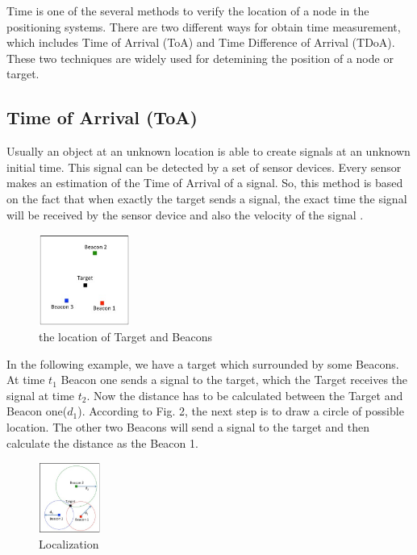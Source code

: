 Time is one of the several methods to verify the location of a node in the positioning systems. There are two different ways for obtain time measurement, which includes Time of Arrival (ToA) and Time Difference of Arrival (TDoA). These two techniques are widely used for detemining the position of a node or target.

\subsection{Time of Arrival (ToA)}

Usually an object at an unknown location is able to create signals at an unknown initial time. This signal can be detected by a set of sensor devices. Every sensor makes an estimation of the Time of Arrival of a signal. So, this method is based on the fact that when exactly the target sends a signal, the exact time the signal will be received by the sensor device and also the velocity of the signal \cite{brian17}.

\begin{figure}[htp]
    \centering
    \includegraphics[width=3cm]{1.jpg}
    \caption{the location of Target and Beacons \cite{brian17}}
    \label{fig:Target location}
\end{figure}

In the following example, we have a target which surrounded by some Beacons. At time $t_1$ Beacon one sends a signal to the target, which the Target receives the signal at time $t_2$. Now the distance has to be calculated between the Target and Beacon one($d_1$). According to Fig. 2, the next step is to draw a circle of possible location. The other two Beacons will send a signal to the target and then calculate the distance as the Beacon 1.

\begin{figure}[htp]
    \centering
    \includegraphics[width=2cm]{2.jpg}
    \caption{Localization \cite{jin18}}
    \label{fig:Localization}
\end{figure}

